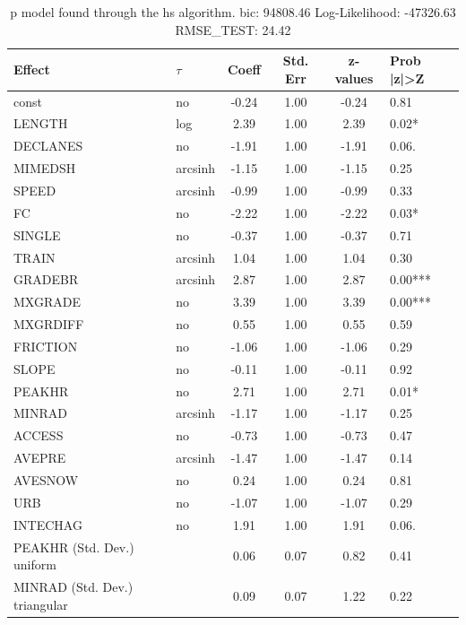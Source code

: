 \begin{table}
	\caption{p model found through the hs algorithm. bic: 94808.46 Log-Likelihood: -47326.63 RMSE_TEST: 24.42}
	\begin{center}
		\begin{tabular}{|l|l|c|c|c|l|}
			\hline
			Effect & $\tau$ & Coeff & Std. Err & z-values & Prob |z|>Z \\
			\hline
			const & no & -0.24 & 1.00 & -0.24 & 0.81 \\
			\hline
			LENGTH & log & 2.39 & 1.00 & 2.39 & 0.02* \\
			\hline
			DECLANES & no & -1.91 & 1.00 & -1.91 & 0.06. \\
			\hline
			MIMEDSH & arcsinh & -1.15 & 1.00 & -1.15 & 0.25 \\
			\hline
			SPEED & arcsinh & -0.99 & 1.00 & -0.99 & 0.33 \\
			\hline
			FC & no & -2.22 & 1.00 & -2.22 & 0.03* \\
			\hline
			SINGLE & no & -0.37 & 1.00 & -0.37 & 0.71 \\
			\hline
			TRAIN & arcsinh & 1.04 & 1.00 & 1.04 & 0.30 \\
			\hline
			GRADEBR & arcsinh & 2.87 & 1.00 & 2.87 & 0.00*** \\
			\hline
			MXGRADE & no & 3.39 & 1.00 & 3.39 & 0.00*** \\
			\hline
			MXGRDIFF & no & 0.55 & 1.00 & 0.55 & 0.59 \\
			\hline
			FRICTION & no & -1.06 & 1.00 & -1.06 & 0.29 \\
			\hline
			SLOPE & no & -0.11 & 1.00 & -0.11 & 0.92 \\
			\hline
			PEAKHR & no & 2.71 & 1.00 & 2.71 & 0.01* \\
			\hline
			MINRAD & arcsinh & -1.17 & 1.00 & -1.17 & 0.25 \\
			\hline
			ACCESS & no & -0.73 & 1.00 & -0.73 & 0.47 \\
			\hline
			AVEPRE & arcsinh & -1.47 & 1.00 & -1.47 & 0.14 \\
			\hline
			AVESNOW & no & 0.24 & 1.00 & 0.24 & 0.81 \\
			\hline
			URB & no & -1.07 & 1.00 & -1.07 & 0.29 \\
			\hline
			INTECHAG & no & 1.91 & 1.00 & 1.91 & 0.06. \\
			\hline
			PEAKHR (Std. Dev.) uniform &  & 0.06 & 0.07 & 0.82 & 0.41 \\
			\hline
			MINRAD (Std. Dev.) triangular &  & 0.09 & 0.07 & 1.22 & 0.22 \\

\end{tabular}
\end{center}
\end{table}
